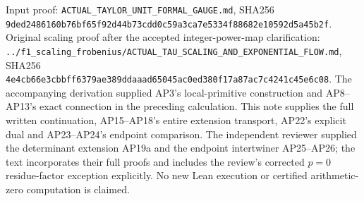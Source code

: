Input proof: \nolinkurl{ACTUAL_TAYLOR_UNIT_FORMAL_GAUGE.md}, SHA256 \nolinkurl{9ded2486160b76bf65f92d44b73cdd0c59a3ca7e5334f88682e10592d5a45b2f}. Original scaling proof after the accepted integer-power-map clarification: \nolinkurl{../f1_scaling_frobenius/ACTUAL_TAU_SCALING_AND_EXPONENTIAL_FLOW.md}, SHA256 \nolinkurl{4e4cb66e3cbbff6379ae389ddaaad65045ac0ed380f17a87ac7c4241c45e6c08}. The accompanying derivation supplied AP3's local-primitive construction and AP8--AP13's exact connection in the preceding calculation. This note supplies the full written continuation, AP15--AP18's entire extension transport, AP22's explicit dual and AP23--AP24's endpoint comparison. The independent reviewer supplied the determinant extension AP19a and the endpoint intertwiner AP25--AP26; the text incorporates their full proofs and includes the review's corrected \(p=0\) residue-factor exception explicitly. No new Lean execution or certified arithmetic-zero computation is claimed.

\endgroup


\endgroup
